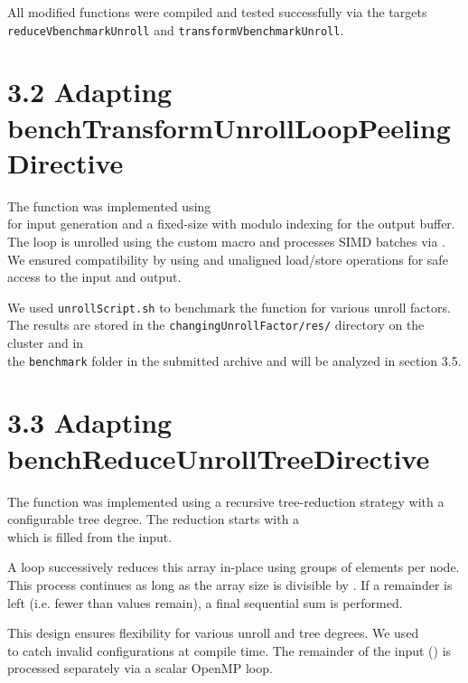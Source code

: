 All modified functions were compiled and tested successfully via the targets \\
\texttt{reduceVbenchmarkUnroll} and \texttt{transformVbenchmarkUnroll}.

\pagebreak

\section*{3.2 Adapting benchTransformUnrollLoopPeelingDirective}

The function  was implemented using \\
 for input generation and a fixed-size  with modulo indexing for the output buffer.
The loop is unrolled using the custom  macro and processes SIMD batches via .
We ensured compatibility by using  and unaligned load/store operations for safe access to the input and output.

We used \texttt{unrollScript.sh} to benchmark the function for various unroll factors. The results are stored in the \texttt{changingUnrollFactor/res/} directory on the cluster and in \\
the \texttt{benchmark} folder in the submitted archive and will be analyzed in section 3.5.

\pagebreak

\section*{3.3 Adapting benchReduceUnrollTreeDirective}

The function  was implemented using a recursive tree-reduction strategy with a configurable tree degree.
The reduction starts with a \\
 which is filled from the  input.

A loop successively reduces this array in-place using groups of  elements per node.
This process continues as long as the array size is divisible by .
If a remainder is left (i.e. fewer than  values remain), a final sequential sum is performed.

This design ensures flexibility for various unroll and tree degrees. We used \\
 to catch invalid configurations at compile time.
The remainder of the input () is processed separately via a scalar OpenMP loop.

